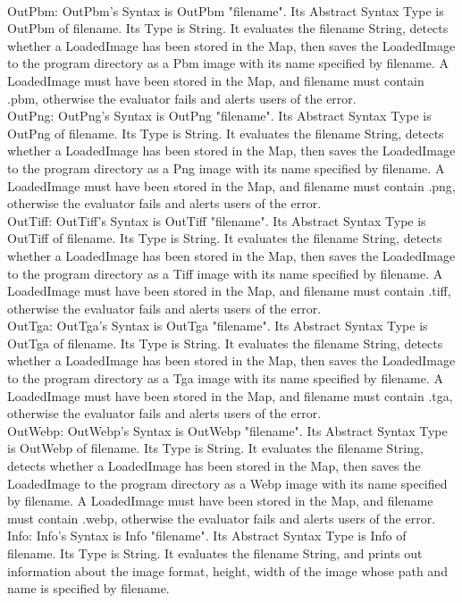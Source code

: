 \documentclass{article}
\begin{document}
\\OutPbm: OutPbm's Syntax is OutPbm "filename". Its Abstract Syntax Type is OutPbm of filename. Its Type is String. It evaluates the filename String, detects whether a LoadedImage has been stored in the Map, then saves the LoadedImage to the program directory as a Pbm image with its name specified by filename. A LoadedImage must have been stored in the Map, and filename must contain .pbm, otherwise the evaluator fails and alerts users of the error.
\\OutPng: OutPng's Syntax is OutPng "filename". Its Abstract Syntax Type is OutPng of filename. Its Type is String. It evaluates the filename String, detects whether a LoadedImage has been stored in the Map, then saves the LoadedImage to the program directory as a Png image with its name specified by filename. A LoadedImage must have been stored in the Map, and filename must contain .png, otherwise the evaluator fails and alerts users of the error.
\\OutTiff: OutTiff's Syntax is OutTiff "filename". Its Abstract Syntax Type is OutTiff of filename. Its Type is String. It evaluates the filename String, detects whether a LoadedImage has been stored in the Map, then saves the LoadedImage to the program directory as a Tiff image with its name specified by filename. A LoadedImage must have been stored in the Map, and filename must contain .tiff, otherwise the evaluator fails and alerts users of the error.
\\OutTga: OutTga's Syntax is OutTga "filename". Its Abstract Syntax Type is OutTga of filename. Its Type is String. It evaluates the filename String, detects whether a LoadedImage has been stored in the Map, then saves the LoadedImage to the program directory as a Tga image with its name specified by filename. A LoadedImage must have been stored in the Map, and filename must contain .tga, otherwise the evaluator fails and alerts users of the error.
\\OutWebp: OutWebp's Syntax is OutWebp "filename". Its Abstract Syntax Type is OutWebp of filename. Its Type is String. It evaluates the filename String, detects whether a LoadedImage has been stored in the Map, then saves the LoadedImage to the program directory as a Webp image with its name specified by filename. A LoadedImage must have been stored in the Map, and filename must contain .webp, otherwise the evaluator fails and alerts users of the error.
\\Info: Info's Syntax is Info "filename". Its Abstract Syntax Type is Info of filename. Its Type is String. It evaluates the filename String, and prints out information about the image format, height, width of the image whose path and name is specified by filename.
\end{document}

